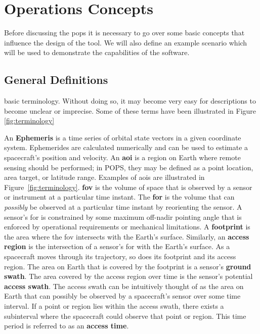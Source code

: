 \glsresetall{} 
\chapter{Operations Concepts}\label{chap:ops}

\lettrine[lines=2, findent=0pt, nindent=5pt]{B}{}efore discussing the
\gls{pops} it is necessary to go over some basic concepts that influence the
design of the tool. We will also define an example scenario which will be used
to demonstrate the capabilities of the software.

\section{General Definitions}

 basic terminology.  Without doing so, it may become very easy for descriptions
 to become unclear or imprecise. Some of these terms have been illustrated in
 Figure \ref{fig:terminology}

An \textbf{Ephemeris} is a time series of orbital state vectors in a given
coordinate system. Ephemerides are calculated numerically and can be used to
estimate a spacecraft’s position and velocity.  An \textbf{\gls{aoi}} is a
region on Earth where remote sensing should be performed; in POPS, they may be
defined as a point location, area target, or latitude range.  Examples of
\glspl{aoi} are illustrated in Figure~\ref{fig:terminology}. \textbf{\gls{fov}} is the volume of
space that is observed by a sensor or instrument at a particular time instant.
The \textbf{\gls{for}} is the volume that can \textit{possibly} be observed at
a particular time instant by reorienting the sensor. A sensor’s \gls{for} is
constrained by some maximum off-nadir pointing angle that is enforced by
operational requirements or mechanical limitations. A \textbf{footprint} is the
area where the \gls{fov} intersects with the Earth’s surface.  Similarly, an
\textbf{access region} is the intersection of a sensor’s \gls{for} with the
Earth’s surface.  As a spacecraft moves through its trajectory, so does its
footprint and its access region.  The area on Earth that is covered by the
footprint is a sensor’s \textbf{ground swath}. The area covered by the access
region over time is the sensor’s potential \textbf{access swath}.  The access
swath can be intuitively thought of as the area on Earth that can possibly be
observed by a spacecraft’s sensor over some time interval.  If a point or
region lies within the access swath, there exists a subinterval where the
spacecraft could observe that point or region. This time period is referred to
as an \textbf{access time}. 

